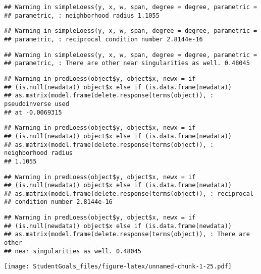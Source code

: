 \documentclass[]{article}
\begin{document}
\begin{verbatim}
## Warning in simpleLoess(y, x, w, span, degree = degree, parametric =
## parametric, : neighborhood radius 1.1055
\end{verbatim}

\begin{verbatim}
## Warning in simpleLoess(y, x, w, span, degree = degree, parametric =
## parametric, : reciprocal condition number 2.8144e-16
\end{verbatim}

\begin{verbatim}
## Warning in simpleLoess(y, x, w, span, degree = degree, parametric =
## parametric, : There are other near singularities as well. 0.48045
\end{verbatim}

\begin{verbatim}
## Warning in predLoess(object$y, object$x, newx = if
## (is.null(newdata)) object$x else if (is.data.frame(newdata))
## as.matrix(model.frame(delete.response(terms(object)), : pseudoinverse used
## at -0.0069315
\end{verbatim}

\begin{verbatim}
## Warning in predLoess(object$y, object$x, newx = if
## (is.null(newdata)) object$x else if (is.data.frame(newdata))
## as.matrix(model.frame(delete.response(terms(object)), : neighborhood radius
## 1.1055
\end{verbatim}

\begin{verbatim}
## Warning in predLoess(object$y, object$x, newx = if
## (is.null(newdata)) object$x else if (is.data.frame(newdata))
## as.matrix(model.frame(delete.response(terms(object)), : reciprocal
## condition number 2.8144e-16
\end{verbatim}

\begin{verbatim}
## Warning in predLoess(object$y, object$x, newx = if
## (is.null(newdata)) object$x else if (is.data.frame(newdata))
## as.matrix(model.frame(delete.response(terms(object)), : There are other
## near singularities as well. 0.48045
\end{verbatim}

\texttt{[image: StudentGoals\_files/figure-latex/unnamed-chunk-1-25.pdf]}
\end{document}
